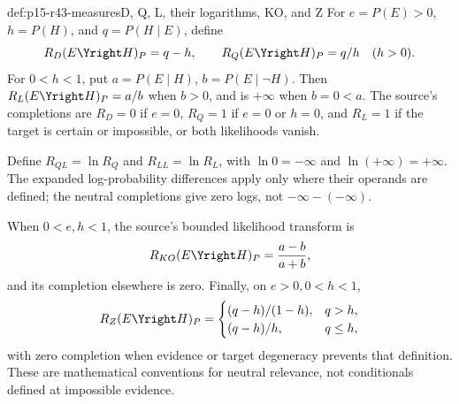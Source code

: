 \begin{hbdefinition}{def:p15-r43-measures}{D, Q, L, their logarithms, KO, and Z}
For \(e=P(E)>0\), \(h=P(H)\), and \(q=P(H\mid E)\), define
\[
 R_D(E\Yright H)_P=q-h,
 \qquad R_Q(E\Yright H)_P=q/h\quad(h>0).
\]
For \(0<h<1\), put \(a=P(E\mid H)\), \(b=P(E\mid\neg H)\).
Then \(R_L(E\Yright H)_P=a/b\) when \(b>0\), and is \(+\infty\)
when \(b=0<a\). The source's completions are \(R_D=0\) if \(e=0\),
\(R_Q=1\) if \(e=0\) or \(h=0\), and \(R_L=1\) if the target is
certain or impossible, or both likelihoods vanish.

Define \(R_{QL}=\ln R_Q\) and \(R_{LL}=\ln R_L\), with
\(\ln0=-\infty\) and \(\ln(+\infty)=+\infty\). The expanded
log-probability differences apply only where their operands are defined;
the neutral completions give zero logs, not \(-\infty-(-\infty)\).

When \(0<e,h<1\), the source's bounded likelihood transform is
\[
 R_{KO}(E\Yright H)_P=\frac{a-b}{a+b},
\]
and its completion elsewhere is zero. Finally, on \(e>0,0<h<1\),
\[
 R_Z(E\Yright H)_P=
 \begin{cases}(q-h)/(1-h),&q>h,\\(q-h)/h,&q\leq h,\end{cases}
\]
with zero completion when evidence or target degeneracy prevents that
definition. These are mathematical conventions for neutral relevance,
not conditionals defined at impossible evidence.
\end{hbdefinition}

